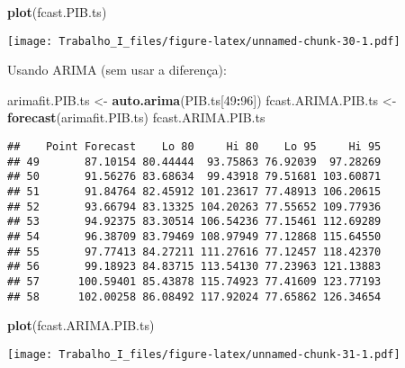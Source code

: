 \documentclass[]{article}
\newenvironment{Shaded}{\begin{snugshade}}{\end{snugshade}}
\newcommand{\KeywordTok}[1]{\textcolor[rgb]{0.13,0.29,0.53}{\textbf{#1}}}
\newcommand{\DecValTok}[1]{\textcolor[rgb]{0.00,0.00,0.81}{#1}}
\newcommand{\StringTok}[1]{\textcolor[rgb]{0.31,0.60,0.02}{#1}}
\newcommand{\OperatorTok}[1]{\textcolor[rgb]{0.81,0.36,0.00}{\textbf{#1}}}
\newcommand{\NormalTok}[1]{#1}
\begin{document}
\begin{Shaded}
\begin{Highlighting}[]
\KeywordTok{plot}\NormalTok{(fcast.PIB.ts)}
\end{Highlighting}
\end{Shaded}

\texttt{[image: Trabalho\_I\_files/figure-latex/unnamed-chunk-30-1.pdf]}

Usando ARIMA (sem usar a diferença):

\begin{Shaded}
\begin{Highlighting}[]
\NormalTok{arimafit.PIB.ts <-}\StringTok{ }\KeywordTok{auto.arima}\NormalTok{(PIB.ts[}\DecValTok{49}\OperatorTok{:}\DecValTok{96}\NormalTok{])}
\NormalTok{fcast.ARIMA.PIB.ts <-}\StringTok{ }\KeywordTok{forecast}\NormalTok{(arimafit.PIB.ts)}
\NormalTok{fcast.ARIMA.PIB.ts}
\end{Highlighting}
\end{Shaded}

\begin{verbatim}
##    Point Forecast    Lo 80     Hi 80    Lo 95     Hi 95
## 49       87.10154 80.44444  93.75863 76.92039  97.28269
## 50       91.56276 83.68634  99.43918 79.51681 103.60871
## 51       91.84764 82.45912 101.23617 77.48913 106.20615
## 52       93.66794 83.13325 104.20263 77.55652 109.77936
## 53       94.92375 83.30514 106.54236 77.15461 112.69289
## 54       96.38709 83.79469 108.97949 77.12868 115.64550
## 55       97.77413 84.27211 111.27616 77.12457 118.42370
## 56       99.18923 84.83715 113.54130 77.23963 121.13883
## 57      100.59401 85.43878 115.74923 77.41609 123.77193
## 58      102.00258 86.08492 117.92024 77.65862 126.34654
\end{verbatim}

\begin{Shaded}
\begin{Highlighting}[]
\KeywordTok{plot}\NormalTok{(fcast.ARIMA.PIB.ts)}
\end{Highlighting}
\end{Shaded}

\texttt{[image: Trabalho\_I\_files/figure-latex/unnamed-chunk-31-1.pdf]}
\end{document}
